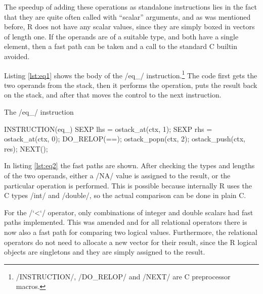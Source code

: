The speedup of adding these operations as standalone instructions lies in the fact that they are quite often called with ``scalar'' arguments, and as was mentioned before, R does not have any scalar values, since they are simply boxed in vectors of length one. If the operands are of a suitable type, and both have a single element, then a fast path can be taken and a call to the standard C builtin avoided.

Listing \ref{lst:eq1} shows the body of the \cinline/eq_/ instruction.\footnote{\cinline/INSTRUCTION/, \cinline/DO_RELOP/ and \cinline/NEXT/ are C preprocessor macros.} The code first gets the two operands from the stack, then it performs the operation, puts the result back on the stack, and after that moves the control to the next instruction.

\begin{listing}[htbp]
  \caption{\label{lst:eq1}The \cinline/eq_/ instruction}
  \begin{ccode}
INSTRUCTION(eq_) {
    SEXP lhs = ostack_at(ctx, 1);
    SEXP rhs = ostack_at(ctx, 0);
    DO_RELOP(==);
    ostack_popn(ctx, 2);
    ostack_push(ctx, res);
    NEXT();
}
  \end{ccode}
\end{listing}

In listing \ref{lst:eq2} the fast paths are shown. After checking the types and lengths of the two operands, either a \rinline/NA/ value is assigned to the result, or the particular operation is performed. This is possible because internally R uses the C types \cinline/int/ and \cinline/double/, so the actual comparison can be done in plain C.

For the \rinline/`<`/ operator, only combinations of integer and double scalars had fast paths implemented. This was amended and for all relational operators there is now also a fast path for comparing two logical values. Furthermore, the relational operators do not need to allocate a new vector for their result, since the R logical objects are singletons and they are simply assigned to the result.

